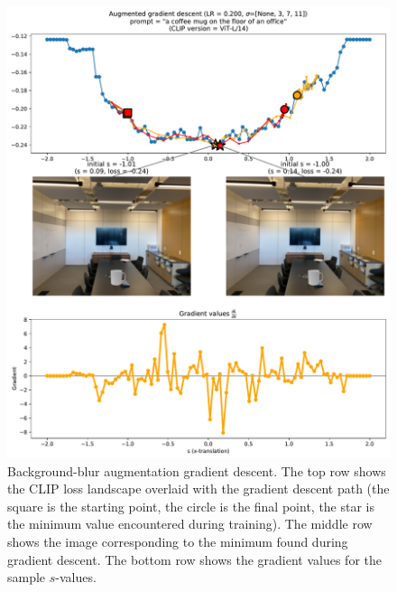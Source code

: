 \begin{figure}[H]
    \centering
    \includegraphics[width=1.0\textwidth]{figures/3_2-room-augment-gd.pdf}
    \caption{Background-blur augmentation gradient descent. The top row shows the CLIP loss landscape overlaid with the gradient descent path (the square is the starting point, the circle is the final point, the star is the minimum value encountered during training). The middle row shows the image corresponding to the minimum found during gradient descent. The bottom row shows the gradient values for the sample $s$-values.}
    \label{fig:3_2-room-augment-gd}
\end{figure}

